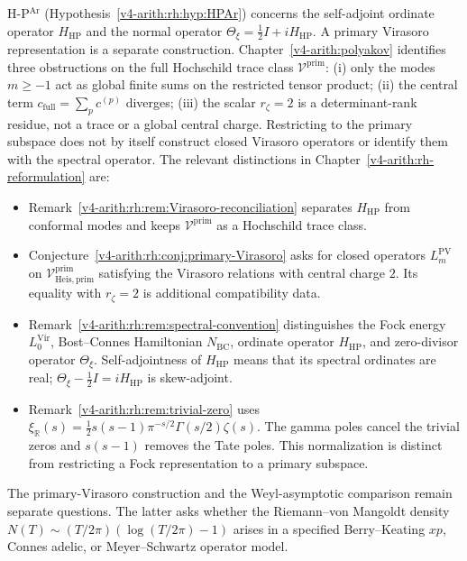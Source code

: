 H-P\(^{\mathrm{Ar}}\) (Hypothesis~\ref{v4-arith:rh:hyp:HPAr}) concerns the
self-adjoint ordinate operator \(H_{\mathrm{HP}}\) and the normal
operator \(\Theta_\xi=\tfrac12 I+iH_{\mathrm{HP}}\).
A primary Virasoro representation is a separate construction.
Chapter~\ref{v4-arith:polyakov} identifies three obstructions on the
full Hochschild trace class \(\mathcal{V}^{\mathrm{prim}}\):
(i) only the modes \(m\ge-1\) act as global finite sums on the
restricted tensor product;
(ii) the central term \(c_{\mathrm{full}}=\sum_p c^{(p)}\) diverges;
(iii) the scalar \(r_\zeta=2\) is a determinant-rank residue, not a
trace or a global central charge.
Restricting to the primary subspace does not by itself construct
closed Virasoro operators or identify them with the spectral operator.
The relevant distinctions in Chapter~\ref{v4-arith:rh-reformulation} are:
\begin{itemize}
\item Remark~\ref{v4-arith:rh:rem:Virasoro-reconciliation} separates
\(H_{\mathrm{HP}}\) from conformal modes and keeps
\(\mathcal{V}^{\mathrm{prim}}\) as a Hochschild trace class.
\item Conjecture~\ref{v4-arith:rh:conj:primary-Virasoro} asks for closed
operators \(L_m^{\mathrm{PV}}\) on
\(\mathcal{V}^{\mathrm{prim}}_{\mathrm{Heis},\mathrm{prim}}\)
satisfying the Virasoro relations with central charge \(2\).
Its equality with \(r_\zeta=2\) is additional compatibility data.
\item Remark~\ref{v4-arith:rh:rem:spectral-convention} distinguishes the
Fock energy \(L_0^{\mathrm{Vir}}\), Bost--Connes Hamiltonian
\(N_{\mathrm{BC}}\), ordinate operator \(H_{\mathrm{HP}}\), and
zero-divisor operator \(\Theta_\xi\). Self-adjointness of
\(H_{\mathrm{HP}}\) means that its spectral ordinates are real;
\(\Theta_\xi-\tfrac12 I=iH_{\mathrm{HP}}\) is skew-adjoint.
\item Remark~\ref{v4-arith:rh:rem:trivial-zero} uses
\(\xi_{\mathbb R}(s)=\tfrac12s(s-1)\pi^{-s/2}\Gamma(s/2)\zeta(s)\).
The gamma poles cancel the trivial zeros and \(s(s-1)\) removes the
Tate poles. This normalization is distinct from restricting a Fock
representation to a primary subspace.
\end{itemize}
The primary-Virasoro construction and the Weyl-asymptotic comparison
remain separate questions. The latter asks whether the
Riemann--von Mangoldt density
\(N(T)\sim(T/2\pi)(\log(T/2\pi)-1)\) arises in a specified
Berry--Keating \(xp\), Connes adelic, or Meyer--Schwartz operator model.

